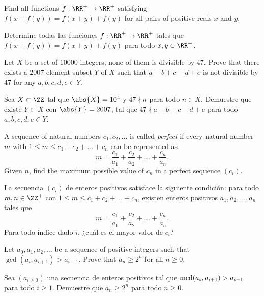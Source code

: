 \begin{probMR}
	Find all functions $f:\RR^+\to\RR^+$ satisfying $f(x+f(y))=f(x+y)+f(y)$ for all pairs of positive reals $x$ and $y$.
	\begin{probSM}
		Determine todas las funciones $f:\RR^+\to\RR^+$ tales que $f(x+f(y))=f(x+y)+f(y)$ para todo $x,y\in\RR^+$.
	\end{probSM}
\end{probMR}

\begin{probMR}
	Let $X$ be a set of $10000$ integers, none of them is divisible by $47$. Prove that there exists a $2007$-element subset $Y$ of $X$ such that $a-b+c-d+e$ is not divisible by $47$ for any $a,b,c,d,e\in Y$.
	\begin{probSM}
		Sea $X\subset\ZZ$ tal que $\abs{X}=10^4$ y $47\nmid n$ para todo $n\in X$. Demuestre que existe $Y\subset X$ con $\abs{Y}=2007$, tal que $47\nmid a-b+c-d+e$ para todo $a,b,c,d,e\in Y$.
	\end{probSM}
\end{probMR}

\begin{probEG}
	A sequence of natural numbers $c_1,c_2,\dots$ is called \emph{perfect} if every natural number $m$ with $1\le m\le c_1+c_2+\dots+c_n$ can be represented as
	\[m=\frac{c_1}{a_1}+\frac{c_2}{a_2}+\dots+\frac{c_n}{a_n}.\]
	Given $n$, find the maximum possible value of $c_n$ in a perfect sequence $(c_i)$.
	\begin{probSM}
		La secuencia $(c_i)$ de enteros positivos satisface la siguiente condición: para todo $m,n\in\ZZ^+$ con $1\le m\le c_1+c_2+\dots+c_n$, existen enteros positivos $a_1,a_2,\dots,a_n$ tales que
		\[m=\frac{c_1}{a_1}+\frac{c_2}{a_2}+\dots+\frac{c_n}{a_n}.\]
		Para todo índice dado $i$, ¿cuál es el mayor valor de $c_i$?
	\end{probSM}
\end{probEG}

\begin{probMR}
	Let $a_0,a_1,a_2,\dots$ be a sequence of positive integers such that $\gcd(a_i,a_{i+1})>a_{i-1}$. Prove that $a_n\ge 2^n$ for all $n\ge 0$.
	\begin{probSM}
		Sea $(a_{i\ge 0})$ una secuencia de enteros positivos tal que $\operatorname{mcd}(a_i,a_{i+1})>a_{i-1}$ para todo $i\ge 1$. Demuestre que $a_n\ge 2^n$ para todo $n\ge 0$.
	\end{probSM}
\end{probMR}

